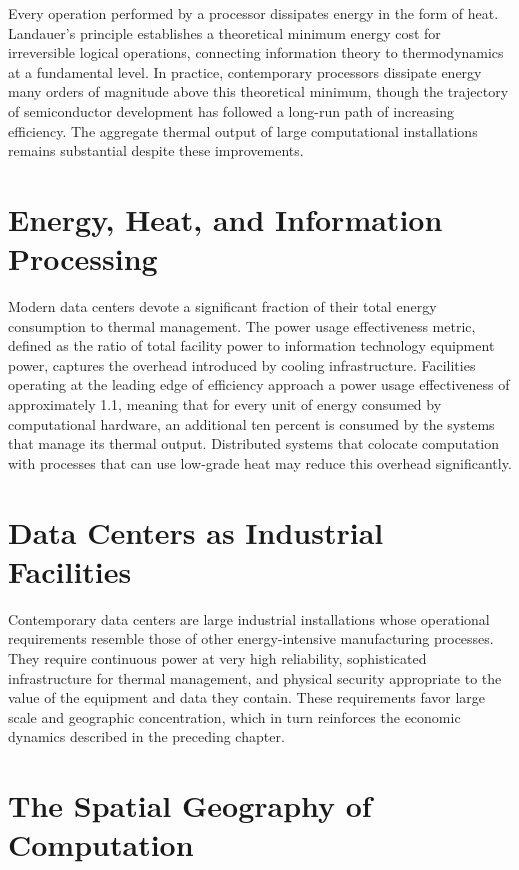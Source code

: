 \documentclass[12pt]{book}
\theoremstyle{definition}
\theoremstyle{remark}
\begin{document}
Every operation performed by a processor dissipates energy in the
form of heat. Landauer's principle establishes a theoretical minimum
energy cost for irreversible logical operations, connecting
information theory to thermodynamics at a fundamental level. In
practice, contemporary processors dissipate energy many orders of
magnitude above this theoretical minimum, though the trajectory of
semiconductor development has followed a long-run path of increasing
efficiency. The aggregate thermal output of large computational
installations remains substantial despite these improvements.

\section{Energy, Heat, and Information Processing}

Modern data centers devote a significant fraction of their total
energy consumption to thermal management. The power usage
effectiveness metric, defined as the ratio of total facility power to
information technology equipment power, captures the overhead
introduced by cooling infrastructure. Facilities operating at the
leading edge of efficiency approach a power usage effectiveness of
approximately 1.1, meaning that for every unit of energy consumed by
computational hardware, an additional ten percent is consumed by the
systems that manage its thermal output. Distributed systems that
colocate computation with processes that can use low-grade heat may
reduce this overhead significantly.

\section{Data Centers as Industrial Facilities}

Contemporary data centers are large industrial installations whose
operational requirements resemble those of other energy-intensive
manufacturing processes. They require continuous power at very high
reliability, sophisticated infrastructure for thermal management, and
physical security appropriate to the value of the equipment and data
they contain. These requirements favor large scale and geographic
concentration, which in turn reinforces the economic dynamics
described in the preceding chapter.

\section{The Spatial Geography of Computation}
\end{document}
